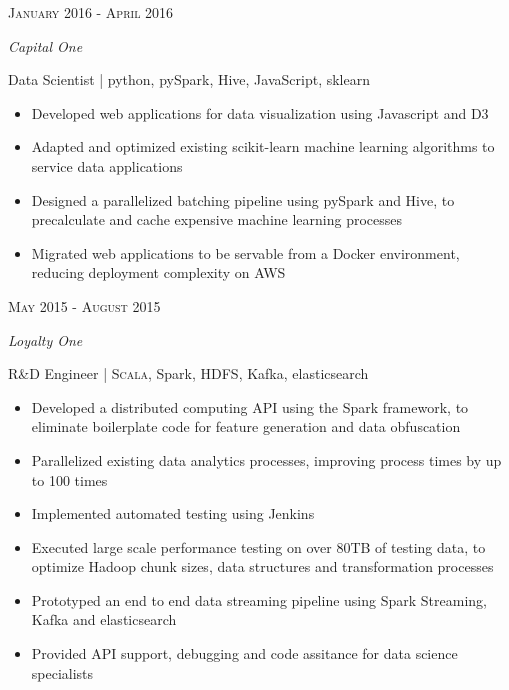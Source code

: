 \documentclass[10pt]{article} %
\begin{document}
{\begin{minipage}[t]{0.6\textwidth}
\begin{itemize}[noitemsep, nosep, leftmargin=.5cm]
\end{itemize}


{\raggedleft\color{gray}\textsc{January 2016 - April 2016}\par}

{\textit{{Capital One}}\\
\raggedright\large Data Scientist \small\color{darkgray} | python, pySpark, Hive, JavaScript, sklearn\\[5pt]}

\begin{itemize}[noitemsep, nosep, leftmargin=.5cm]
  \item {Developed web applications for data visualization using Javascript and D3}
  \item {Adapted and optimized existing scikit-learn machine learning algorithms to service data applications}
  \item {Designed a parallelized batching pipeline using pySpark and Hive, to precalculate and cache expensive machine learning processes}
  \item {Migrated web applications to be servable from a Docker environment, reducing deployment complexity on AWS}

\end{itemize}


{\raggedleft\color{gray}\textsc{May 2015 - August 2015}\par}

{\textit{{Loyalty One}}\\
\raggedright\large R\&D Engineer \small\color{darkgray} | \textsc{Scala}, Spark, \textsc{HDFS}, Kafka, elasticsearch\\[5pt]}

\begin{itemize}[noitemsep, nosep, leftmargin=.5cm]
  \item {Developed a distributed computing API using the Spark framework,
  		to eliminate boilerplate code for feature generation and data obfuscation}
  \item {Parallelized existing data analytics processes, improving process times by up to 100 times}
  \item {Implemented automated testing using Jenkins}
  \item {Executed large scale performance testing on over 80TB of testing data,
		to optimize Hadoop chunk sizes, data structures and transformation processes}
  \item {Prototyped an end to end data streaming pipeline using Spark Streaming, Kafka and elasticsearch}
  \item {Provided API support, debugging and code assitance for data science specialists}


\end{itemize}
\end{minipage}}
\end{document}
